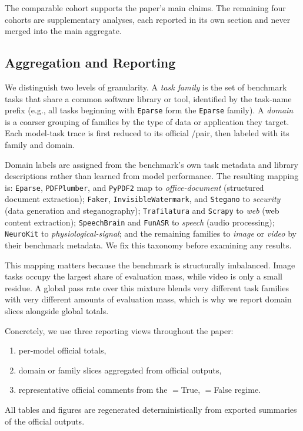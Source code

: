 \medskip\noindent
The comparable cohort supports the paper's main claims. The remaining four
cohorts are supplementary analyses, each reported in its own section and never
merged into the main aggregate.

\subsection{Aggregation and Reporting}

We distinguish two levels of granularity. A \emph{task family} is the set of
benchmark tasks that share a common software library or tool, identified by the
task-name prefix (e.g., all tasks beginning with \texttt{Eparse} form the
\texttt{Eparse} family). A \emph{domain} is a coarser grouping of families by
the type of data or application they target. Each model-task trace is first
reduced to its official \processmetric/\resultmetric pair, then labeled with
its family and domain.

Domain labels are assigned from the benchmark's own task metadata and library
descriptions rather than learned from model performance. The resulting mapping
is:
\texttt{Eparse}, \texttt{PDFPlumber}, and \texttt{PyPDF2} map to
\emph{office-document} (structured document extraction);
\texttt{Faker}, \texttt{InvisibleWatermark}, and \texttt{Stegano} to
\emph{security} (data generation and steganography);
\texttt{Trafilatura} and \texttt{Scrapy} to \emph{web} (web content
extraction);
\texttt{SpeechBrain} and \texttt{FunASR} to \emph{speech} (audio processing);
\texttt{NeuroKit} to \emph{physiological-signal};
and the remaining families to \emph{image} or \emph{video} by their benchmark
metadata. We fix this taxonomy before examining any results.

This mapping matters because the benchmark is structurally imbalanced. Image
tasks occupy the largest share of evaluation mass, while video is only a small
residue. A global pass rate over this mixture blends very different task
families with very different amounts of evaluation mass, which is why we report
domain slices alongside global totals.

Concretely, we use three reporting views throughout the paper:
\begin{enumerate}[leftmargin=1.25em]
\item per-model official totals,
\item domain or family slices aggregated from official outputs,
\item representative official comments from the
\processmetric$=$True, \resultmetric$=$False regime.
\end{enumerate}

\noindent All tables and figures are regenerated deterministically from exported
summaries of the official outputs.
